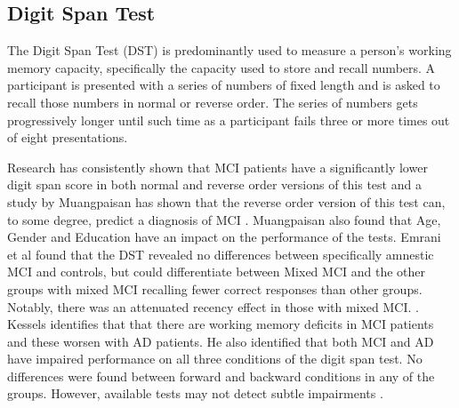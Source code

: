 \subsection{Digit Span Test}
The Digit Span Test (DST) is predominantly used to measure a person's working memory capacity, specifically the capacity used to store and recall numbers. A participant is presented with a series of numbers of fixed length and is asked to recall those numbers in normal or reverse order. The series of numbers gets progressively longer until such time as a participant fails three or more times out of eight presentations.
\par
Research has consistently shown that MCI patients have a significantly lower digit span score in both normal and reverse order versions of this test and a study by Muangpaisan has shown that the reverse order version of this test can, to some degree, predict a diagnosis of MCI \cite{Muangpaisan2008}. Muangpaisan also found that Age, Gender and Education have an impact on the performance of the tests. Emrani et al found that the DST revealed no differences between specifically amnestic MCI and controls, but could differentiate between Mixed MCI and the other groups with mixed MCI recalling fewer correct responses than other groups. Notably, there was an attenuated recency effect in those with mixed MCI. \cite{Emrani2018}. Kessels identifies that that there are working memory deficits in MCI patients and these worsen with AD patients. \cite{Kessels2011} He also identified that both MCI and AD have impaired performance on all three conditions of the digit span test. No differences were found between forward and backward conditions in any of the groups. However, available tests may not detect subtle impairments \cite{Kessels2015}.
